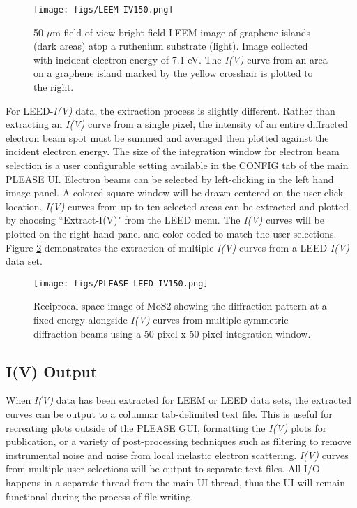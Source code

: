 \begin{figure}
    \centering
        \texttt{[image: figs/LEEM-IV150.png]}
    \caption{50 $\mu$m field of view bright field LEEM image of graphene islands (dark areas) atop a ruthenium substrate (light). Image collected with incident electron energy of 7.1 eV. The \textit{I(V)} curve from an area on a graphene island marked by the yellow crosshair is plotted to the right.}
    \label{fig:please1}
\end{figure}

For LEED-\textit{I(V)} data, the extraction process is slightly different. Rather than extracting an \textit{I(V)} curve from a single pixel, the intensity of an entire diffracted electron beam spot must be summed and averaged then plotted against the incident electron energy. The size of the integration window for electron beam selection is a user configurable setting available in the CONFIG tab of the main PLEASE UI. Electron beams can be selected by left-clicking in the left hand image panel. A colored square window will be drawn centered on the user click location. \textit{I(V)} curves from up to ten selected areas can be extracted and plotted by choosing ``Extract-I(V)" from the LEED menu. The \textit{I(V)} curves will be plotted on the right hand panel and color coded to match the user selections. Figure \ref{fig:please2} demonstrates the extraction of multiple \textit{I(V)} curves from a LEED-\textit{I(V)} data set.


\begin{figure}
    \centering
        \texttt{[image: figs/PLEASE-LEED-IV150.png]}
    \caption{Reciprocal space image of MoS2 showing the diffraction pattern at a fixed energy alongside \textit{I(V)} curves from multiple symmetric diffraction beams using a 50 pixel x 50 pixel integration window.}
\label{fig:please2}
\end{figure}

\subsection{I(V) Output}
When \textit{I(V)} data has been extracted for LEEM or LEED data sets, the extracted curves can be output to a columnar tab-delimited text file. This is useful for recreating plots outside of the PLEASE GUI, formatting the \textit{I(V)} plots for publication, or a variety of post-processing techniques such as filtering to remove instrumental noise and noise from local inelastic electron scattering. \textit{I(V)} curves from multiple user selections will be output to separate text files. All I/O happens in a separate thread from the main UI thread, thus the UI will remain functional during the process of file writing.

